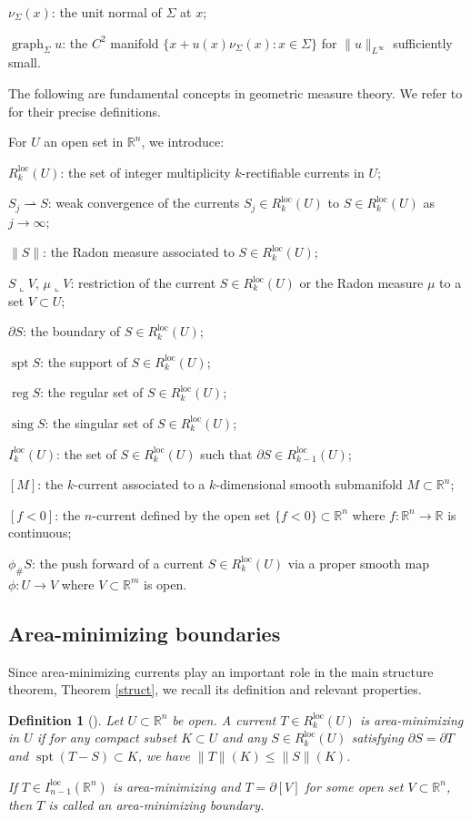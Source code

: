 \documentclass[pdflatex,sn-mathphys-num]{sn-jnl}%
\theoremstyle{thmstyleone}%
\theoremstyle{thmstyletwo}%
\theoremstyle{thmstylethree}%
\newtheorem{definition}{Definition}%
\newcommand{\R}{\mathbb{R}}
\newcommand{\loc}{\mathrm{loc}}
\DeclareMathOperator{\spt}{spt}
\DeclareMathOperator{\sing}{sing}
\DeclareMathOperator{\reg}{reg}
\DeclareMathOperator{\graph}{graph}
\begin{document}
$\nu_\Sigma(x)$: the unit normal of $\Sigma$ at $x$;

$\graph_\Sigma u$: the $C^2$ manifold $\{x+u(x)\nu_\Sigma(x):x\in \Sigma\}$ for $\|u\|_{L^\infty}$ sufficiently small.

The following are fundamental concepts in geometric measure theory. We refer to \cite{Fed,morgan2016gmt,Sim} for their precise definitions.

For $U$ an open set in $\R^n$, we introduce:

$R_k^\loc(U)$: the set of integer multiplicity $k$-rectifiable currents in $U$;

$S_j\rightharpoonup S$: weak convergence of the currents $S_j\in R_k^\loc(U)$ to $S\in R_k^\loc(U)$ as $j\to\infty$;

$\|S\|$: the Radon measure associated to $S\in R_k^\loc(U)$;

$S\llcorner V$, $\mu\llcorner V$: restriction of the current $S\in R_k^\loc(U)$ or the Radon measure $\mu$ to a set $V\subset U$;

$\partial S$: the boundary of $S\in R_k^\loc(U)$;

$\spt S$: the support of $S\in R_k^\loc(U)$;

$\reg S$: the regular set of $S\in R_k^\loc(U)$;

$\sing S$: the singular set of $S\in R_k^\loc(U)$;

$I_k^\loc(U)$: the set of $S\in R_k^\loc(U)$ such that $\partial S\in R_{k-1}^\loc(U)$;

$[M]$: the $k$-current associated to a $k$-dimensional smooth submanifold $M\subset \R^n$;

$[f<0]$: the $n$-current defined by the open set $\{f<0\}\subset\R^n$ where $f:\R^n\to\R$ is continuous;

$\phi_\#S$: the push forward of a current $S\in R_k^\loc(U)$ via a proper smooth map $\phi:U\to V$ where $V\subset \R^m$ is open.


\subsection{Area-minimizing boundaries}
Since area-minimizing currents play an important role in the main structure theorem, Theorem \ref{struct}, we recall its definition and relevant properties.
\begin{definition}[\cite{Fed,morgan2016gmt,Sim}]
	Let $U\subset \R^n$ be open. A current $T\in R_k^\loc(U)$ is \textit{area-minimizing} in $U$ if for any compact subset $K\subset U$ and any $S\in R_k^\loc(U)$ satisfying $\partial S=\partial T$ and $\spt(T-S)\subset K$, we have $\|T\|(K)\le \|S\|(K)$.
	
	If $T\in I_{n-1}^\loc(\R^n)$ is area-minimizing and $T=\partial [V]$ for some open set $V\subset \R^n$, then $T$ is called an \textit{area-minimizing boundary}.
\end{definition}
\end{document}
